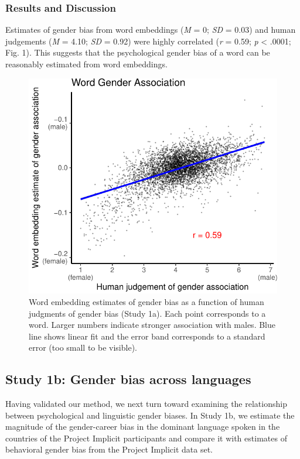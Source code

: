 \documentclass[man,floatsintext]{apa6}
\theoremstyle{definition}
\theoremstyle{definition}
\theoremstyle{definition}
\theoremstyle{remark}
\begin{document}
\subsubsection{Results and Discussion}\label{results-and-discussion}

Estimates of gender bias from word embeddings (\emph{M} = 0; \emph{SD} =
0.03) and human judgements (\emph{M} = 4.10; \emph{SD} = 0.92) were
highly correlated (\emph{r} = 0.59; \emph{p} \textless{} .0001; Fig. 1).
This suggests that the psychological gender bias of a word can be
reasonably estimated from word embeddings.

\begin{figure}
\centering
\includegraphics{iat_lang_files/figure-latex/unnamed-chunk-11-1.pdf}
\caption{\label{fig:unnamed-chunk-11}Word embedding estimates of gender bias
as a function of human judgments of gender bias (Study 1a). Each point
corresponds to a word. Larger numbers indicate stronger association with
males. Blue line shows linear fit and the error band corresponds to a
standard error (too small to be visible).}
\end{figure}

\subsection{Study 1b: Gender bias across
languages}\label{study-1b-gender-bias-across-languages}

Having validated our method, we next turn toward examining the
relationship between psychological and linguistic gender biases. In
Study 1b, we estimate the magnitude of the gender-career bias in the
dominant language spoken in the countries of the Project Implicit
participants and compare it with estimates of behavioral gender bias
from the Project Implicit data set.
\end{document}
